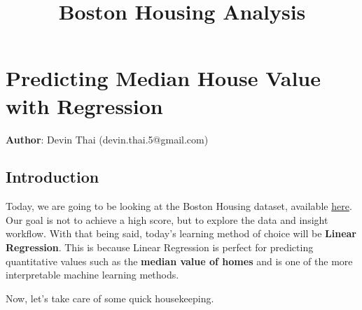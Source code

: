 \documentclass[11pt]{article}
\title{Boston Housing Analysis}
\begin{document}
    
    
    \maketitle
    
    

    
    \hypertarget{predicting-median-house-value-with-regression}{%
\section{Predicting Median House Value with
Regression}\label{predicting-median-house-value-with-regression}}

\textbf{Author}: Devin Thai (devin.thai.5@gmail.com)

\hypertarget{introduction}{%
\subsection{Introduction}\label{introduction}}

Today, we are going to be looking at the Boston Housing dataset,
available \href{https://www.kaggle.com/c/boston-housing}{here}. Our goal
is not to achieve a high score, but to explore the data and insight
workflow. With that being said, today's learning method of choice will
be \textbf{Linear Regression}. This is because Linear Regression is
perfect for predicting quantitative values such as the \textbf{median
value of homes} and is one of the more interpretable machine learning
methods.

Now, let's take care of some quick housekeeping.
\end{document}
